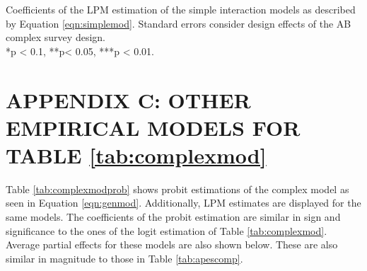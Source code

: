 \documentclass[floatsintext,man]{apa7}\usepackage[]{graphicx}\usepackage[]{color}
\begin{document}
\begin{table}[htbp]
\begin{center}
\end{center}
Coefficients of the LPM estimation of the simple interaction models as described by Equation \ref{eqn:simplemod}. Standard errors consider design effects of the AB complex survey design. \\ 
*p < 0.1, **p< 0.05, ***p < 0.01.
\end{table}




\clearpage


\section{APPENDIX C: OTHER EMPIRICAL MODELS FOR TABLE \ref{tab:complexmod}}
\label{app:third}
Table \ref{tab:complexmodprob} shows probit estimations of the complex model as seen in Equation \ref{eqn:genmod}. Additionally, LPM estimates are displayed for the same models. The coefficients of the probit estimation are similar in sign and significance to the ones of the logit estimation of Table \ref{tab:complexmod}. Average partial effects for these models are also shown below. These are also similar in magnitude to those in Table \ref{tab:apescomp}. 
\clearpage


\renewcommand{\arraystretch}{0.65}
\end{document}
